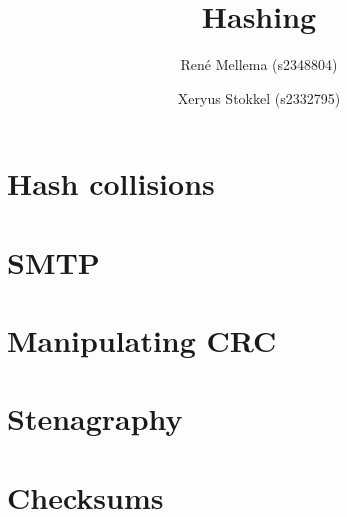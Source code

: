 \documentclass[a4paper, 10pt]{article}
\title{Hashing}
\author{Ren\'e Mellema (s2348804) \and Xeryus Stokkel (s2332795)}
\date{} %
\begin{document}
\maketitle

\setcounter{section}{17}

\section{Hash collisions}


\section{SMTP}


\section{Manipulating CRC}


\section{Stenagraphy}


\section{Checksums}

\end{document}
